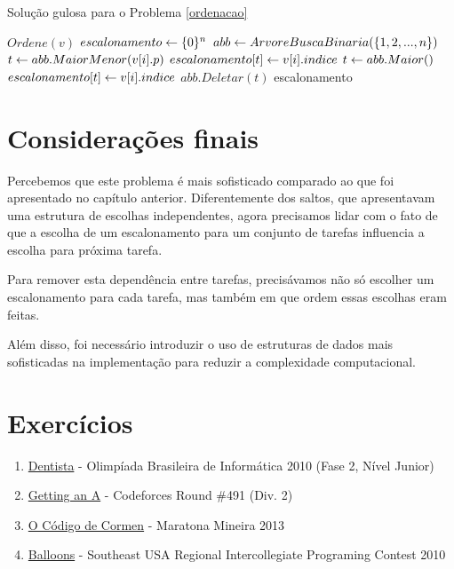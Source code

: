 \begin{algorithm}[H]
\caption{Solução gulosa para o Problema \ref{ordenacao}}
\label{ordenacao:code}
\begin{algorithmic}[1]
    \State $Ordene(v)$
    \State $escalonamento \leftarrow \{0\}^n$
    \State $abb \leftarrow ArvoreBuscaBinaria(\{1, 2, ..., n\})$
        \State $t \leftarrow abb.MaiorMenor(v[i].p)$
            \State $escalonamento[t] \leftarrow v[i].indice$
        \Else
            \State $t \leftarrow abb.Maior()$
            \State $escalonamento[t] \leftarrow v[i].indice$
        \EndIf
        \State $abb.Deletar(t)$
    \EndFor
    \State \Return escalonamento
\EndFunction
\end{algorithmic}
\end{algorithm}

\section{Considerações finais}

Percebemos que este problema é mais sofisticado comparado ao que foi apresentado no capítulo anterior. Diferentemente dos saltos, que apresentavam uma estrutura de escolhas independentes, agora precisamos lidar com o fato de que a escolha de um escalonamento para um conjunto de tarefas influencia a escolha para próxima tarefa.

Para remover esta dependência entre tarefas, precisávamos não só escolher um escalonamento para cada tarefa, mas também em que ordem essas escolhas eram feitas.

Além disso, foi necessário introduzir o uso de estruturas de dados mais sofisticadas na implementação para reduzir a complexidade computacional.

\section{Exercícios}

\begin{enumerate}
  \item \href{https://br.spoj.com/problems/JDENTIST/}{Dentista} - Olimpíada Brasileira de Informática 2010 (Fase 2, Nível Junior)
  \item \href{https://codeforces.com/problemset/problem/991/B}{Getting an A} - Codeforces Round \#491 (Div. 2)
  \item \href{https://br.spoj.com/problems/CORMENMG/}{O Código de Cormen} - Maratona Mineira 2013
  \item \href{https://icpcarchive.ecs.baylor.edu/index.php?option=com_onlinejudge&Itemid=8&category=410&page=show_problem&problem=2864}{Balloons} - Southeast USA Regional Intercollegiate Programing Contest 2010
\end{enumerate}